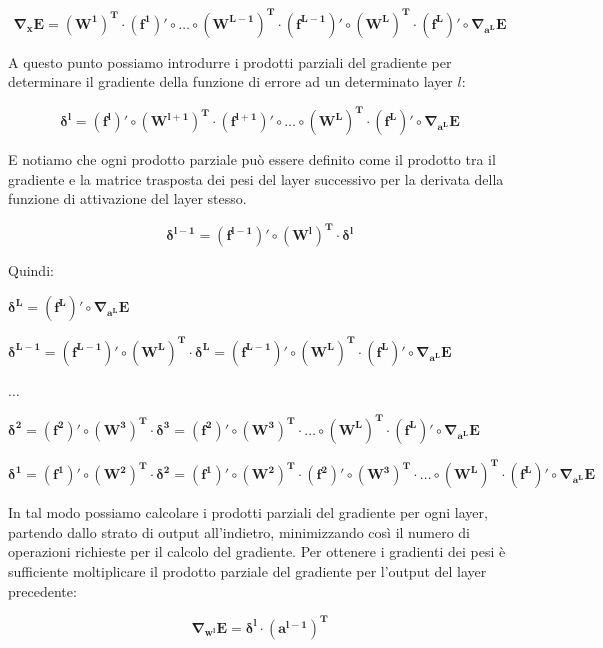 \begin{equation}
    \mathbf{\nabla_{x} E = (W^1)^T \cdot (f^1)' \circ \dots \circ (W^{L-1})^T \cdot (f^{L-1})' \circ (W^{L})^T \cdot (f^{L})' \circ \nabla_{a^L} E}
\end{equation}

A questo punto possiamo introdurre i prodotti parziali del gradiente per determinare il gradiente della funzione di errore ad un determinato layer $l$:

\begin{equation}
    \mathbf{\delta^{l} = (f^{l})' \circ (W^{l+1})^T \cdot (f^{l+1})' \circ \dots \circ (W^{L})^T \cdot (f^{L})' \circ \nabla_{a^L} E}
\end{equation}

E notiamo che ogni prodotto parziale può essere definito come il prodotto tra il gradiente e la matrice trasposta dei pesi del layer successivo per
la derivata della funzione di attivazione del layer stesso.

\begin{equation}
    \mathbf{\delta^{l-1} = (f^{l-1})' \circ (W^{l})^T \cdot \delta^{l}}
\end{equation}

Quindi:

    $\mathbf{\delta^{L} = (f^{L})' \circ \nabla_{a^L} E}$

    $\mathbf{\delta^{L-1} = (f^{L-1})' \circ (W^{L})^T \cdot \delta^{L} = (f^{L-1})' \circ (W^{L})^T \cdot (f^{L})' \circ \nabla_{a^L} E}$

    $\dots$

    $\mathbf{\delta^{2} = (f^{2})' \circ (W^{3})^T \cdot \delta^{3} = (f^{2})' \circ (W^{3})^T \cdot \dots \circ (W^{L})^T \cdot (f^{L})' \circ \nabla_{a^L} E}$

    $\mathbf{\delta^{1} = (f^{1})' \circ (W^{2})^T \cdot \delta^{2} = (f^{1})' \circ (W^{2})^T \cdot (f^{2})' \circ (W^{3})^T \cdot \dots \circ (W^{L})^T \cdot (f^{L})' \circ \nabla_{a^L} E}$

In tal modo possiamo calcolare i prodotti parziali del gradiente per ogni layer, partendo dallo strato di output all'indietro, minimizzando così il numero di operazioni
richieste per il calcolo del gradiente. Per ottenere i gradienti dei pesi è sufficiente moltiplicare il prodotto parziale del gradiente per l'output del layer precedente:

\begin{equation}
    \mathbf{\nabla_{w^{l}} E = \delta^{l} \cdot (a^{l-1})^T}
\end{equation}

